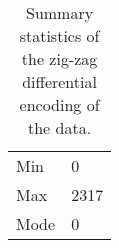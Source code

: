 \begin{table}
    \caption{\label{tab:diff} Summary statistics of the zig-zag differential encoding of the data.}
    \begin{tabular}{|l|l|}
        \hline
Min & 0\\

Max & 2317\\
\hline
	    Mode & 0\\
	\hline
    \end{tabular}
\end{table}

